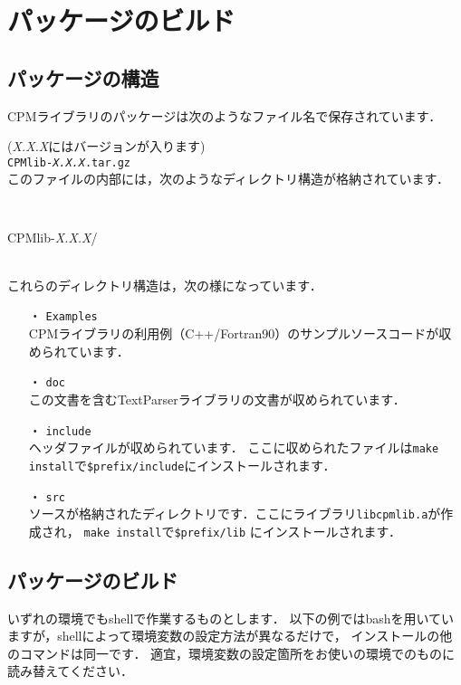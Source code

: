 \section{パッケージのビルド}
\label{build}

\subsection{パッケージの構造}
CPMライブラリのパッケージは次のようなファイル名で保存されています．\par
({\it X.X.X}にはバージョンが入ります)\\

{\tt CPMlib-{\it X.X.X}.tar.gz}\\

このファイルの内部には，次のようなディレクトリ構造が格納されています．\\

{\tt
\begin{classify}{CPMlib-{\it X.X.X}/}
\end{classify}
}
\vspace*{1cm}
\\
\indent
これらのディレクトリ構造は，次の様になっています．
\begin{itemize}
\item[・] {\tt Examples}\\
CPMライブラリの利用例（C++/Fortran90）のサンプルソースコードが収められています．\\
\item[・] {\tt doc}\\
この文書を含むTextParserライブラリの文書が収められています．\\
\item[・] {\tt include}\\
ヘッダファイルが収められています．
ここに収められたファイルは{\tt make install}で{\tt \$prefix/include}にインストールされます．\\
\item[・] {\tt src}\\
ソースが格納されたディレクトリです．ここにライブラリ{\tt libcpmlib.a}が作成され，
{\tt make install}で{\tt \$prefix/lib} にインストールされます．\\
\end{itemize}
\clearpage

\subsection{パッケージのビルド}
いずれの環境でもshellで作業するものとします．
以下の例ではbashを用いていますが，shellによって環境変数の設定方法が異なるだけで，
インストールの他のコマンドは同一です．
適宜，環境変数の設定箇所をお使いの環境でのものに読み替えてください．

